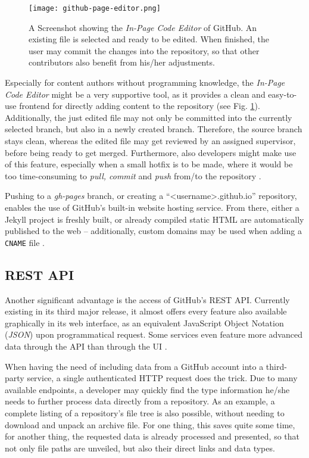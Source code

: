 \begin{figure} %
    \centering
    \texttt{[image: github-page-editor.png]}
    \caption{A Screenshot showing the \emph{In-Page Code Editor} of GitHub. An existing file is selected and ready to be edited. When finished, the user may commit the changes into the repository, so that other contributors also benefit from his/her adjustments.}
    \label{fig:github-page-editor}
\end{figure}
%

Especially for content authors without programming knowledge, the \emph{In-Page Code Editor} might be a very supportive tool, as it provides a clean and easy-to-use frontend for directly adding content to the repository (see Fig. \ref{fig:github-page-editor}). Additionally, the just edited file may not only be committed into the currently selected branch, but also in a newly created branch. Therefore, the source branch stays clean, whereas the edited file may get reviewed by an assigned supervisor, before being ready to get merged.
Furthermore, also developers might make use of this feature, especially when a small hotfix is to be made, where it would be too time-consuming to \emph{pull, commit} and \emph{push} from/to the repository \cite[405]{loeliger2012version}.

Pushing to a \emph{gh-pages} branch, or creating a ``<username>.github.io'' repository, enables the use of GitHub's built-in website hosting service. From there, either a Jekyll project is freshly built, or already compiled static HTML are automatically published to the web -- additionally, custom domains may be used when adding a \texttt{CNAME} file \cite[p. 171f]{dhillon2016}.

\subsection{REST API}
Another significant advantage is the access of GitHub's REST API. Currently existing in its third major release, it almost offers every feature also available graphically in its web interface, as an equivalent JavaScript Object Notation (\emph{JSON}) upon programmatical request. Some services even feature more advanced data through the API than through the UI \cite[410]{loeliger2012version}.

When having the need of including data from a GitHub account into a third-party service, a single authenticated HTTP request does the trick. Due to many available endpoints, a developer may quickly find the type information he/she needs to further process data directly from a repository. As an example, a complete listing of a repository's file tree is also possible, without needing to download and unpack an archive file. For one thing, this saves quite some time, for another thing, the requested data is already processed and presented, so that not only file paths are unveiled, but also their direct links and data types.

